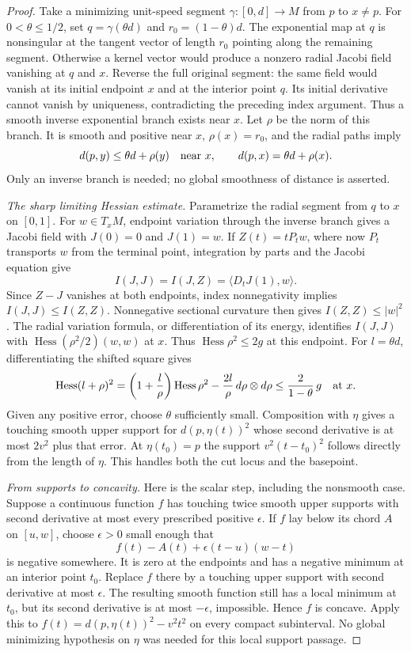 \begin{proof}
Take a minimizing unit-speed segment $\gamma:[0,d]\to M$
from $p$ to $x\ne p$.  For $0<\theta\leq1/2$, set
$q=\gamma(\theta d)$ and $r_0=(1-\theta)d$.
The exponential map at $q$ is nonsingular at the tangent vector
of length $r_0$ pointing along the remaining segment.  Otherwise
a kernel vector would produce a nonzero radial Jacobi field
vanishing at $q$ and $x$.  Reverse the full original segment:
the same field would vanish at its initial endpoint $x$ and at
the interior point $q$.  Its initial derivative cannot vanish
by uniqueness, contradicting the preceding index argument.
Thus a smooth inverse exponential branch exists near $x$.
Let $\rho$ be the norm of this branch.  It is smooth and
positive near $x$, $\rho(x)=r_0$, and the radial paths imply
\[
          d(p,y)\leq\theta d+\rho(y)
          \quad\hbox{near }x,\qquad
          d(p,x)=\theta d+\rho(x).
\]
Only an inverse branch is needed; no global smoothness of
distance is asserted.

\emph{The sharp limiting Hessian estimate.}
Parametrize the radial segment from $q$ to $x$ on $[0,1]$.
For $w\in T_xM$, endpoint variation through the inverse branch
gives a Jacobi field with $J(0)=0$ and $J(1)=w$.
If $Z(t)=tP_tw$, where now $P_t$ transports $w$ from the terminal
point, integration by parts and the Jacobi equation give
\[
 I(J,J)=I(J,Z)=\langle D_tJ(1),w\rangle .
\]
Since $Z-J$ vanishes at both endpoints, index nonnegativity
implies $I(J,J)\leq I(Z,Z)$.  Nonnegative sectional curvature
then gives $I(Z,Z)\leq |w|^2$.
The radial variation formula, or differentiation of its energy,
identifies $I(J,J)$ with
$\operatorname{Hess}(\rho^2/2)(w,w)$ at $x$.
Thus $\operatorname{Hess}\rho^2\leq2g$ at this endpoint.
For $l=\theta d$, differentiating the shifted square gives
\[
 \operatorname{Hess}(l+\rho)^2
 =\left(1+\frac l\rho\right)\operatorname{Hess}\rho^2
       -\frac{2l}{\rho}\,d\rho\otimes d\rho
 \leq\frac{2}{1-\theta}\,g
 \quad\hbox{at }x.
\]
Given any positive error, choose $\theta$ sufficiently small.
Composition with $\eta$ gives a touching smooth upper support
for $d(p,\eta(t))^2$ whose second derivative is at most
$2v^2$ plus that error.  At $\eta(t_0)=p$ the support
$v^2(t-t_0)^2$ follows directly from the length of $\eta$.
This handles both the cut locus and the basepoint.

\emph{From supports to concavity.}
Here is the scalar step, including the nonsmooth case.
Suppose a continuous function $f$ has touching twice smooth
upper supports with second derivative at most every prescribed
positive $\epsilon$.  If $f$ lay below its chord $A$ on
$[u,w]$, choose $\epsilon>0$ small enough that
\[
                   f(t)-A(t)+\epsilon(t-u)(w-t)
\]
is negative somewhere.  It is zero at the endpoints and has
a negative minimum at an interior point $t_0$.
Replace $f$ there by a touching upper support with second
derivative at most $\epsilon$.  The resulting smooth function
still has a local minimum at $t_0$, but its second derivative
is at most $-\epsilon$, impossible.  Hence $f$ is concave.
Apply this to $f(t)=d(p,\eta(t))^2-v^2t^2$ on every compact
subinterval.  No global minimizing hypothesis on $\eta$ was
needed for this local support passage.


\end{proof}
